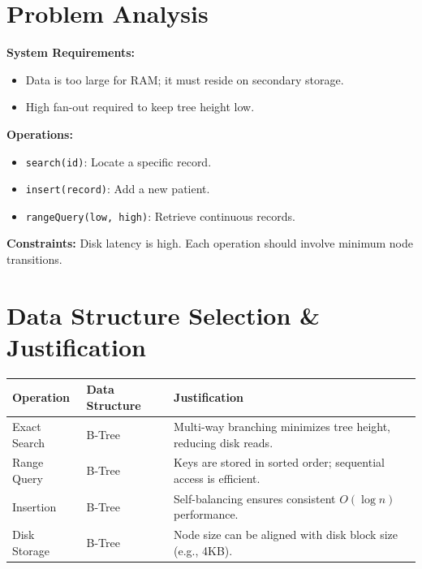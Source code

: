 \documentclass[11pt,a4paper]{article}
\begin{document}
\section{Problem Analysis}
\textbf{System Requirements:}
\begin{itemize}[noitemsep]
    \item Data is too large for RAM; it must reside on secondary storage.
    \item High fan-out required to keep tree height low.
\end{itemize}
\textbf{Operations:}
\begin{itemize}[noitemsep]
    \item \texttt{search(id)}: Locate a specific record.
    \item \texttt{insert(record)}: Add a new patient.
    \item \texttt{rangeQuery(low, high)}: Retrieve continuous records.
\end{itemize}
\textbf{Constraints:} Disk latency is high. Each operation should involve minimum node transitions.

\section{Data Structure Selection \& Justification}
\begin{table}[H]
\small
\begin{tabularx}{\textwidth}{@{}l l X@{}}
\toprule
\textbf{Operation} & \textbf{Data Structure} & \textbf{Justification}\\
\midrule
Exact Search & B-Tree & Multi-way branching minimizes tree height, reducing disk reads.\\
Range Query & B-Tree & Keys are stored in sorted order; sequential access is efficient.\\
Insertion & B-Tree & Self-balancing ensures consistent $O(\log n)$ performance.\\
Disk Storage & B-Tree & Node size can be aligned with disk block size (e.g., 4KB).\\
\bottomrule
\end{tabularx}
\end{table}

\end{document}
